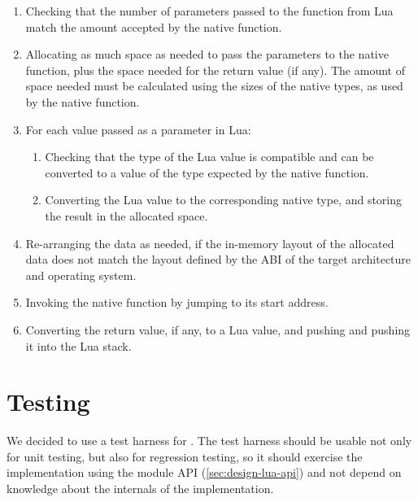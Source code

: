 \begin{enumerate}

	\item Checking that the number of parameters passed to the function from Lua
	match the amount accepted by the native function.

	\item Allocating as much space as needed to pass the parameters to
	the native function, plus the space needed for the return value (if any).
	The amount of space needed must be calculated using the sizes of the native
	types, as used by the native function.

	\item For each value passed as a parameter in Lua:

		\begin{enumerate}

			\item Checking that the type of the Lua value is compatible and can be
			converted to a value of the type expected by the native function.

			\item Converting the Lua value to the corresponding native type, and
				storing the result in the allocated space.

		\end{enumerate}

	\item Re-arranging the data as needed, if the in-memory layout of the
		allocated data does not match the layout defined by the \gls{ABI} of the
		target architecture and operating system.

	\item Invoking the native function by jumping to its start address.

	\item Converting the return value, if any, to a Lua value, and pushing
		and pushing it into the Lua stack.

\end{enumerate}


\section{Testing}
	\label{sec:design-testing}

We decided to use  a test harness for \Eol*. The test harness should be usable
not only for unit testing, but also for regression testing, so it should
exercise the implementation using the \Eol* module API
(\autoref{sec:design-lua-api}) and not depend on knowledge about the internals
of the implementation.


